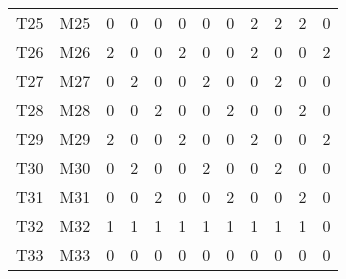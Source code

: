 \begin{table}[h]
\begin{tabular}{rrrrrrrrrrrr}
		T25 & M25 & 0 & 0 & 0 & 0 & 0 & 0 & 2 & 2 & 2 & 0 \\
		T26 & M26 & 2 & 0 & 0 & 2 & 0 & 0 & 2 & 0 & 0 & 2 \\
		T27 & M27 & 0 & 2 & 0 & 0 & 2 & 0 & 0 & 2 & 0 & 0 \\
		T28 & M28 & 0 & 0 & 2 & 0 & 0 & 2 & 0 & 0 & 2 & 0 \\
		T29 & M29 & 2 & 0 & 0 & 2 & 0 & 0 & 2 & 0 & 0 & 2 \\
		T30 & M30 & 0 & 2 & 0 & 0 & 2 & 0 & 0 & 2 & 0 & 0 \\
		T31 & M31 & 0 & 0 & 2 & 0 & 0 & 2 & 0 & 0 & 2 & 0 \\
		T32 & M32 & 1 & 1 & 1 & 1 & 1 & 1 & 1 & 1 & 1 & 0 \\
		T33 & M33 & 0 & 0 & 0 & 0 & 0 & 0 & 0 & 0 & 0 & 0 \\
		\bottomrule
	\end{tabular}
\end{table}

